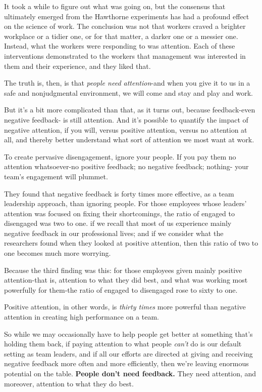 \documentclass[ebook,12pt,oneside,openany]{memoir}
\begin{document}
It took a while to figure out what was going on, but the consensus that 
ultimately emerged from the Hawthorne experiments has had a profound effect on the 
science of work. 
The conclusion was not that workers craved a brighter workplace or a tidier
one, or for that matter, a darker one or a messier one.
Instead, what the workers were responding to was attention.
Each of these interventions demonstrated to the workers that management was interested in them
and their experience, and they liked that. 

The truth is, then, is that \textit{people need attention}-and when you give it to us
in a safe and nonjudgmental environment, we will come and stay and play and work.

But it's a bit more complicated than that, as it turns out, because feedback-even negative feedback-
is still attention. And it's possible to quantify the impact of negative attention, 
if you will, versus positive attention, versus no attention at all, and thereby better understand what sort of attention
we most want at work.

To create pervasive disengagement, ignore your people. If you pay them no attention
whatsoever-no positive feedback; no negative feedback; nothing- your team's engagement will plummet.

They found that negative feedback is forty times more effective, as a team leadership approach, than ignoring people.
For those employees whose leaders' attention was focused on fixing their shortcomings, 
the ratio of engaged to disengaged was two to one.
if we recall that most of us experience mainly negative feedback in our professional lives;
and if we consider what the researchers found when they looked at positive attention, 
then this ratio of two to one becomes much more worrying. 

Because the third finding was this: for those employees given mainly positive attention-that is,
attention to what they did best, and what was working most powerfully for them-the ratio
of engaged to disengaged rose to sixty to one.

Positive attention, in other words, is \textit{thirty times} more powerful than negative attention 
in creating high performance on a team. 

So while we may occasionally have to help people get better at something that's
holding them back, if paying attention to what people \textit{can't} do is our default setting as team leaders,
and if all our efforts are directed at giving and receiving negative feedback more often and more efficiently,
then we're leaving enormous potential on the table.
\textbf{People don't need feedback.}
They need attention, and moreover, attention to what they do best. 
\end{document}
